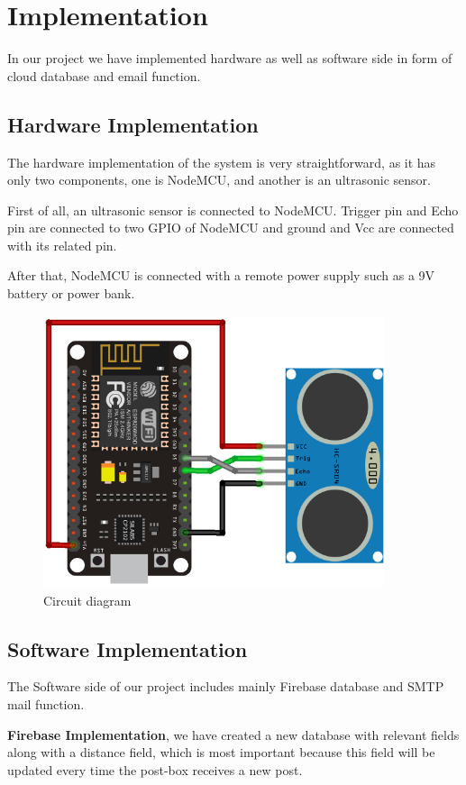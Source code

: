\section{Implementation}
In our project we have implemented hardware as well as software side in form of cloud database and email function.
\subsection{Hardware Implementation}
The hardware implementation of the system is very straightforward, as it has only two components, one is NodeMCU, and another is an ultrasonic sensor.

First of all, an ultrasonic sensor is connected to NodeMCU. Trigger pin and Echo pin are connected to two GPIO of NodeMCU and ground and Vcc are connected with its related pin.

After that, NodeMCU is connected with a remote power supply such as a 9V battery or power bank. 
\begin{figure}[htp]
    \centering
    \includegraphics[width=10cm, height=8cm]{image/Circuit_diagram.png}
    \caption{Circuit diagram}
    \label{fig:circuit_diagram}
\end{figure}

\subsection{Software Implementation}
The Software side of our project includes mainly Firebase database and SMTP mail function.

\textbf{Firebase Implementation}, we have created a new database with relevant fields along with a distance field, which is most important because this field will be updated every time the post-box receives a new post.

